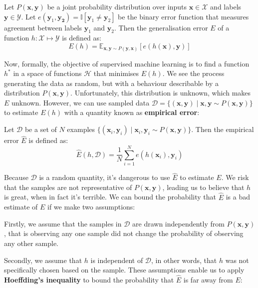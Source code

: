 \begin{definition} \label{generalisation_error}
	Let $P(\mathbf{x}, \mathbf{y})$ be a joint probability distribution over inputs $\mathbf{x} \in \mathcal{X}$ and labels $\mathbf{y} \in \mathcal{Y}$. Let $e(\mathbf{y}_1, \mathbf{y_2}) = \mathbb{I}[\mathbf{y}_1 \neq \mathbf{y}_2]$ be the binary error function that measures agreement between labels $\mathbf{y}_1$ and $\mathbf{y}_2$. Then the generalisation error $E$ of a function $h: \mathcal{X} \mapsto \mathcal{Y}$ is defined as:
	$$
		E(h) = \mathbb{E}_{\mathbf{x},\mathbf{y}\sim P(\mathbf{y}, \mathbf{x})}[e(h(\mathbf{x}), \mathbf{y})]
	$$
\end{definition}
Now, formally, the objective of supervised machine learning is to find a function $h^*$ in a space of functions $\mathcal{H}$ that minimises $E(h)$. We see the process generating the data as random, but with a behaviour describable by a distribution $P(\mathbf{x}, \mathbf{y})$. Unfortunately, this distribution is unknown, which makes $E$ unknown. However, we can use sampled data $\mathcal{D} = \{(\mathbf{x}, \mathbf{y}) \mid \mathbf{x}, \mathbf{y} \sim P(\mathbf{x}, \mathbf{y})\}$ to estimate $E(h)$ with a quantity known as \textbf{empirical error}:

\begin{definition} \label{empirical_error}
	Let $\mathcal{D}$ be a set of $N$ examples $\{(\mathbf{x}_i, \mathbf{y}_i) \mid \mathbf{x}_i, \mathbf{y}_i \sim P(\mathbf{x}, \mathbf{y})\}$. Then the empirical error $\hat{E}$ is defined as:
	$$
		\hat{E}(h, \mathcal{D}) = \frac{1}{N}\sum\limits_{i=1}^N e(h(\mathbf{x}_i), \mathbf{y}_i)
	$$
\end{definition}

Because $\mathcal{D}$ is a random quantity, it's dangerous to use $\hat{E}$ to estimate $E$. We risk that the samples are not representative of $P(\mathbf{x}, \mathbf{y})$, leading us to believe that $h$ is great, when in fact it's terrible. We can bound the probability that $\hat{E}$ is a bad estimate of $E$ if we make two assumptions:

Firstly, we assume that the samples in $\mathcal{D}$ are drawn independently from $P(\mathbf{x}, \mathbf{y})$, that is observing any one sample did not change the probability of observing any other sample.

Secondly, we assume that $h$ is independent of $\mathcal{D}$, in other words, that $h$ was not specifically chosen based on the sample. These assumptions enable us to apply \textbf{Hoeffding's inequality} to bound the probability that $\hat{E}$ is far away from $E$:

